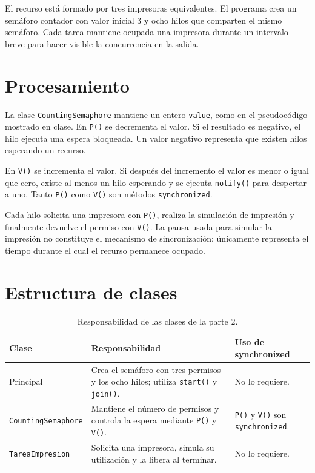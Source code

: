 \documentclass[12pt,oneside]{template/liverpoolthesis}
\begin{document}
El recurso está formado por tres impresoras equivalentes. El programa crea un
semáforo contador con valor inicial 3 y ocho hilos que comparten el mismo
semáforo. Cada tarea mantiene ocupada una impresora durante un intervalo breve
para hacer visible la concurrencia en la salida.

\section{Procesamiento}

La clase \texttt{CountingSemaphore} mantiene un entero \texttt{value}, como en
el pseudocódigo mostrado en clase. En \texttt{P()} se decrementa el valor. Si
el resultado es negativo, el hilo ejecuta una espera bloqueada. Un valor
negativo representa que existen hilos esperando un recurso.

En \texttt{V()} se incrementa el valor. Si después del incremento el valor es
menor o igual que cero, existe al menos un hilo esperando y se ejecuta
\texttt{notify()} para despertar a uno. Tanto \texttt{P()} como \texttt{V()}
son métodos \texttt{synchronized}.

Cada hilo solicita una impresora con \texttt{P()}, realiza la simulación de
impresión y finalmente devuelve el permiso con \texttt{V()}. La pausa usada
para simular la impresión no constituye el mecanismo de sincronización;
únicamente representa el tiempo durante el cual el recurso permanece ocupado.

\section{Estructura de clases}

\begin{table}[H]
\centering
\caption{Responsabilidad de las clases de la parte 2.}
\label{tab:clases-contador}
\begin{tabularx}{\textwidth}{P{3.8cm} L P{2.7cm}}
\toprule
\textbf{Clase} & \textbf{Responsabilidad} & \textbf{Uso de synchronized}\\
\midrule
Principal & Crea el semáforo con tres permisos y los ocho hilos; utiliza
\texttt{start()} y \texttt{join()}. & No lo requiere.\\
\texttt{CountingSemaphore} & Mantiene el número de permisos y controla la
espera mediante \texttt{P()} y \texttt{V()}. & \texttt{P()} y \texttt{V()}
son \texttt{synchronized}.\\
\texttt{TareaImpresion} & Solicita una impresora, simula su utilización y la
libera al terminar. & No lo requiere.\\
\bottomrule
\end{tabularx}
\end{table}
\end{document}
